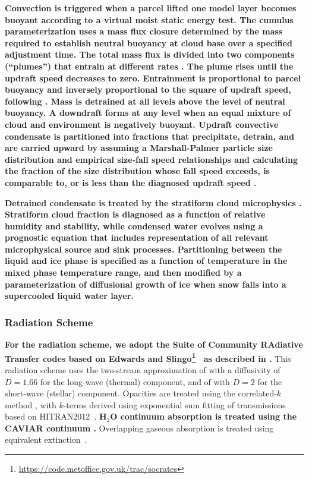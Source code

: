 \documentclass[11pt,numberedappendix,twocolappendix,]{emulateapj}
\def\revise#1{{\bf #1}}
\begin{document}
\revise{%
Convection is triggered when a parcel lifted one model layer becomes buoyant according to a virtual moist static energy test. 
The cumulus parameterization uses a mass flux closure determined by the mass required to establish neutral buoyancy at cloud base over a specified adjustment time. 
The total mass flux is divided into two components (``plumes'') that entrain at different rates \citep{DelGenio2007}. 
The plume rises until the updraft speed decreases to zero. 
Entrainment is proportional to parcel buoyancy and inversely proportional to the square of updraft speed, following \citet{Gregory2001}. 
Mass is detrained at all levels above the level of neutral buoyancy. 
A downdraft forms at any level when an equal mixture of cloud and environment is negatively buoyant. 
Updraft convective condensate is partitioned into fractions that precipitate, detrain, and are carried upward by assuming a Marshall-Palmer particle size distribution and empirical size-fall speed relationships and calculating the fraction of the size distribution whose fall speed exceeds, is comparable to, or is less than the diagnosed updraft speed \citep{DelGenio2005}. }

\revise{Detrained condensate is treated by the stratiform cloud microphysics \citep[an updated version of][]{DelGenio1996}. 
Stratiform cloud fraction is diagnosed as a function of relative humidity and stability, while condensed water evolves using a prognostic equation that includes representation of all relevant microphysical source and sink processes.  
Partitioning between the liquid and ice phase is specified as a function of temperature in the mixed phase temperature range, and then modified by a parameterization of diffusional growth of ice when snow falls into a supercooled liquid water layer. }


\subsubsection{Radiation Scheme}

\revise{For the radiation scheme, we adopt the Suite of Community RAdiative Transfer codes based on Edwards and Slingo\footnote{\url{https://code.metoffice.gov.uk/trac/socrates}}~\citep[SOCRATES,][]{EdwardsSlingo1996,Edwards1996} as described in \citet{Way2017}.}
This radiation scheme uses the two-stream approximation of \citet{Zdunkowski1985} with a diffusivity of $D=1.66$ for the long-wave (thermal) component, and of \citet{Zdunkowski1980} with $D=2$ for the short-wave (stellar) component. 
Opacities are treated using the correlated-$k$ method \citep{Lacis1991,Goody1989}, with $k$-terms derived using exponential sum fitting of transmissions~\citep{Wiscombe1977} based on HITRAN2012~\citep{Rothman2013}. 
\revise{H$_2$O continuum absorption is treated using the CAVIAR continuum \citep{Ptashnik2011}.}
Overlapping gaseous absorption is treated using equivalent extinction~\citep{Edwards1996,Amundsen2016}. 
\end{document}
